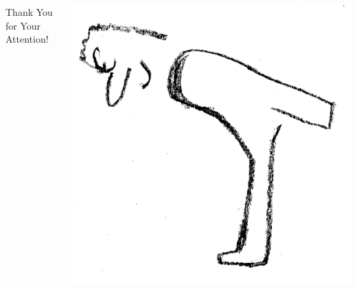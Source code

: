 \documentclass[english,xcolor=pdftex,dvipsnames,compress,aspectratio=169,handout]{beamer}
\begin{document}






\begin{frame}
 \centering
 \begin{columns}
   \begin{column}{0.8\textwidth}
     \centering
     \Large
     Thank You for Your Attention!
   \end{column}
   \begin{column}{0.2\textwidth}
     
      \includegraphics[width=.6\textwidth]{images/end}
   \end{column}
 \end{columns}
\end{frame}
\end{document}
